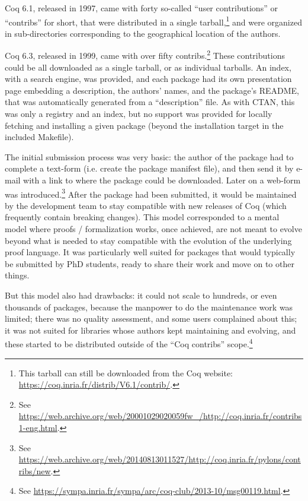 Coq 6.1, released in 1997, came with forty so-called ``user contributions'' or ``contribs'' for short, that were distributed in a single tarball,\footnote{
	This tarball can still be downloaded from the Coq website: \url{https://coq.inria.fr/distrib/V6.1/contrib/}.
} and were organized in sub-directories corresponding to the geographical location of the authors.

Coq 6.3, released in 1999, came with over fifty contribs.\footnote{
	See \url{https://web.archive.org/web/20001029020059fw\_/http://coq.inria.fr/contribs1-eng.html}.
}
These contributions could be all downloaded as a single tarball, or as individual tarballs.
An index, with a search engine, was provided, and each package had its own presentation page embedding a description, the authors' names, and the package's README, that was automatically generated from a ``description'' file.
As with CTAN, this was only a registry and an index, but no support was provided for locally fetching and installing a given package (beyond the installation target in the included Makefile).

The initial submission process was very basic: the author of the package had to complete a text-form (i.e. create the package manifest file), and then send it by e-mail with a link to where the package could be downloaded.
Later on a web-form was introduced.\footnote{
	See \url{https://web.archive.org/web/20140813011527/http://coq.inria.fr/pylons/contribs/new}.
}
After the package had been submitted, it would be maintained by the development team to stay compatible with new releases of Coq (which frequently contain breaking changes).
This model corresponded to a mental model where proofs / formalization works, once achieved, are not meant to evolve beyond what is needed to stay compatible with the evolution of the underlying proof language.
It was particularly well suited for packages that would typically be submitted by PhD students, ready to share their work and move on to other things.

But this model also had drawbacks: it could not scale to hundreds, or even thousands of packages, because the manpower to do the maintenance work was limited; there was no quality assessment, and some users complained about this; it was not suited for libraries whose authors kept maintaining and evolving, and these started to be distributed outside of the ``Coq contribs'' scope.\footnote{
	See \url{https://sympa.inria.fr/sympa/arc/coq-club/2013-10/msg00119.html}.
}

